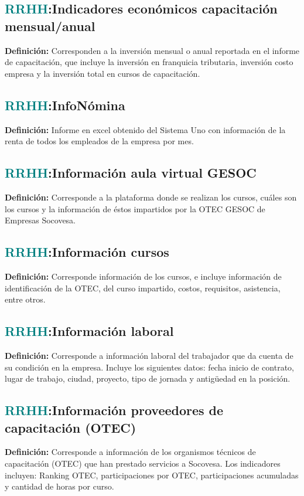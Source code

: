 \documentclass[12pt]{article}
\begin{document}
\subsection{\textcolor{teal}{RRHH}:{Indicadores económicos capacitación mensual/anual}}
\textbf{Definición:} Corresponden a la inversión mensual o anual reportada en el informe de capacitación, que incluye la inversión en franquicia tributaria, inversión costo empresa y la inversión total en cursos de capacitación.
\subsection{\textcolor{teal}{RRHH}:{InfoNómina}}
\textbf{Definición:} Informe en excel obtenido del Sistema Uno con información de la renta de todos los empleados de la empresa por mes.
\subsection{\textcolor{teal}{RRHH}:{Información aula virtual GESOC}}
\textbf{Definición:} Corresponde a la plataforma donde se realizan los cursos, cuáles son los cursos y la información de éstos impartidos por la OTEC GESOC de Empresas Socovesa. 
\subsection{\textcolor{teal}{RRHH}:{Información cursos }}
\textbf{Definición:} Corresponde información de los cursos, e incluye información de identificación de la OTEC, del curso impartido, costos, requisitos, asistencia, entre otros.
\subsection{\textcolor{teal}{RRHH}:{Información laboral}}
\textbf{Definición:} Corresponde a información laboral del trabajador que da cuenta de su condición en la empresa. Incluye los siguientes datos: fecha inicio de contrato, lugar de trabajo, ciudad, proyecto, tipo de jornada y antigüedad en la posición.
\subsection{\textcolor{teal}{RRHH}:{Información proveedores de capacitación (OTEC)}}
\textbf{Definición:} Corresponde a información de los organismos técnicos de capacitación (OTEC) que han prestado servicios a Socovesa. Los indicadores incluyen: Ranking OTEC, participaciones por OTEC, participaciones acumuladas y cantidad de horas por curso.
\end{document}
